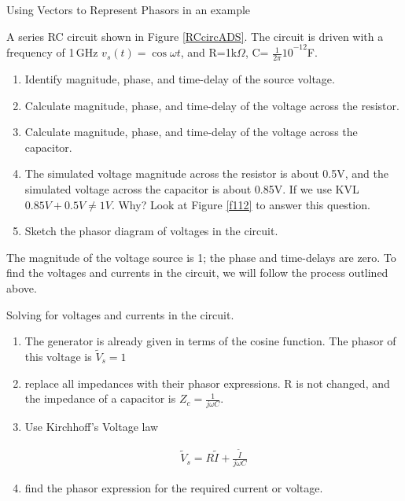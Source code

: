 \documentclass{ximera}
\begin{document}
\begin{example}
Using Vectors to Represent Phasors in an example

A series RC circuit shown in Figure \ref{RCcircADS}. The circuit is driven with a frequency of 1\,GHz $v_s(t)=  \cos \omega t$, and R=1k$\Omega $, C= ${\frac{1}{2\pi }10}^{-12}$F. 
 


\begin{enumerate}
\item  Identify magnitude, phase, and time-delay of the source voltage.

\item  Calculate magnitude, phase, and time-delay of the voltage across the resistor.

\item  Calculate magnitude, phase, and time-delay of the voltage across the capacitor.

\item  The simulated voltage magnitude across the resistor is about 0.5V, and the simulated voltage across the capacitor is about 0.85V.  If we use KVL $ 0.85V+0.5V \neq 1V$. Why? Look at Figure \ref{f112}  to answer this question.

\item Sketch the phasor diagram of voltages in the circuit. 

\end{enumerate}

\begin{explanation} 
The magnitude of the voltage source is 1; the phase and time-delays are zero. To find the voltages and currents in the circuit, we will follow the process outlined above.

Solving for voltages and currents in the circuit.
 \begin{enumerate}
\item The generator is already given in terms of the cosine function. The phasor of this voltage is $\tilde{V}_s= 1$ 
\item replace all impedances with their phasor expressions. R is not changed, and the impedance of a capacitor is $Z_c=\frac{1}{j \omega C}$.
\item  Use Kirchhoff's Voltage law

\begin{eqnarray}
\tilde{V}_s  = R \tilde{I}    + \frac{\tilde{I}}{j \omega C}  
\end{eqnarray}

\item find the phasor expression for the required current or voltage. 


\end{enumerate}
\end{explanation}
\end{example}
\end{document}
